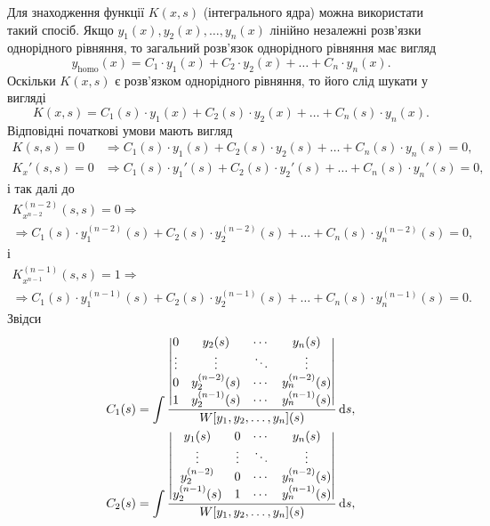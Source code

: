 Для знаходження функції $K(x, s)$ (інтегрального ядра) можна використати такий спосіб. Якщо $y_1(x), y_2(x), \ldots, y_n(x)$ лінійно незалежні роз\-в'яз\-ки однорідного рівняння, то загальний роз\-в'яз\-ок однорідного рівняння має вигляд 
\begin{equation*}
	y_{\text{homo}}(x) = C_1 \cdot y_1(x) + C_2 \cdot y_2(x) + \ldots + C_n \cdot y_n(x).
\end{equation*}
Оскільки $K(x, s)$ є розв’язком однорідного рівняння, то його слід шукати у вигляді
\begin{equation*}
	K(x, s) = C_1(s) \cdot y_1(x) + C_2(s) \cdot y_2(x) + \ldots + C_n(s) \cdot y_n(x).
\end{equation*}
Відповідні початкові умови мають вигляд
\begin{align*}
	K(s, s) = 0 &\Rightarrow C_1(s) \cdot y_1(s) + C_2(s) \cdot y_2(s) + \ldots + C_n(s) \cdot y_n(s) = 0, \\
	K_x'(s, s) = 0 &\Rightarrow C_1(s) \cdot y_1'(s) + C_2(s) \cdot y_2'(s) + \ldots + C_n(s) \cdot y_n'(s) = 0,
\end{align*}
і так далі до
\begin{multline*}
	K_{x^{n - 2}}^{(n - 2)}(s, s) = 0 \Rightarrow \\ \Rightarrow C_1(s) \cdot y_1^{(n - 2)}(s) + C_2(s) \cdot y_2^{(n - 2)}(s) + \ldots + C_n(s) \cdot y_n^{(n - 2)}(s) = 0,
\end{multline*}
і
\begin{multline*}
	K_{x^{n - 1}}^{(n - 1)}(s, s) = 1 \Rightarrow \\ \Rightarrow C_1(s) \cdot y_1^{(n - 1)}(s) + C_2(s) \cdot y_2^{(n - 1)}(s) + \ldots + C_n(s) \cdot y_n^{(n - 1)}(s) = 0. 
\end{multline*}
Звідси
\begin{align*}
	C_1(s) &= \int \frac{\begin{vmatrix} 0 & y_2(s) & \cdots & y_n(s) \\ \vdots & \vdots & \ddots & \vdots \\ 0 & y_2^{(n - 2)}(s) & \cdots & y_n^{(n - 2)}(s) \\ 1 & y_2^{(n - 1)}(s) & \cdots & y_n^{(n - 1)}(s) \end{vmatrix}}{W[y_1, y_2, \ldots, y_n](s)} \mathop{}\!\mathrm{d} s, \\
	C_2(s) &= \int \frac{\begin{vmatrix} y_1(s) & 0 & \cdots & y_n(s) \\ \vdots & \vdots & \ddots & \vdots \\ y_2^{(n - 2)} & 0 & \cdots & y_n^{(n - 2)}(s) \\ y_2^{(n - 1)}(s) & 1 & \cdots & y_n^{(n - 1)}(s) \end{vmatrix}}{W[y_1, y_2, \ldots, y_n](s)} \mathop{}\!\mathrm{d} s,
\end{align*}
